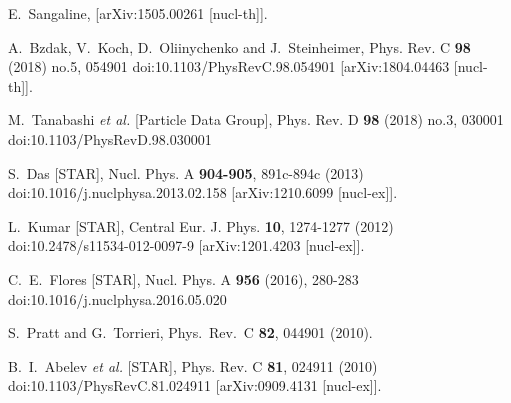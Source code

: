 \begin{thebibliography}{99}
E.~Sangaline,
[arXiv:1505.00261 [nucl-th]].

A.~Bzdak, V.~Koch, D.~Oliinychenko and J.~Steinheimer,
Phys. Rev. C \textbf{98} (2018) no.5, 054901
doi:10.1103/PhysRevC.98.054901
[arXiv:1804.04463 [nucl-th]].


M.~Tanabashi \textit{et al.} [Particle Data Group],
Phys. Rev. D \textbf{98} (2018) no.3, 030001
doi:10.1103/PhysRevD.98.030001


S.~Das [STAR],
Nucl. Phys. A \textbf{904-905}, 891c-894c (2013)
doi:10.1016/j.nuclphysa.2013.02.158
[arXiv:1210.6099 [nucl-ex]].

L.~Kumar [STAR],
Central Eur. J. Phys. \textbf{10}, 1274-1277 (2012)
doi:10.2478/s11534-012-0097-9
[arXiv:1201.4203 [nucl-ex]].

C.~E.~Flores [STAR],
Nucl. Phys. A \textbf{956} (2016), 280-283
doi:10.1016/j.nuclphysa.2016.05.020

%
  S.~Pratt and G.~Torrieri,
  Phys.\ Rev.\ C {\bf 82}, 044901 (2010).
	
B.~I.~Abelev \textit{et al.} [STAR],
Phys. Rev. C \textbf{81}, 024911 (2010)
doi:10.1103/PhysRevC.81.024911
[arXiv:0909.4131 [nucl-ex]].


\end{thebibliography}
